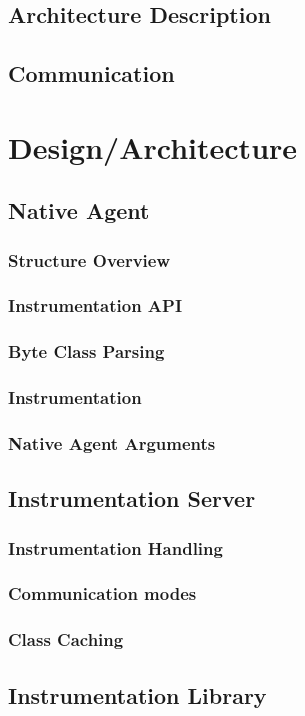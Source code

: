 \documentclass[12pt,a4paper]{report}
\begin{document}
\section{Architecture Description}
\section{Communication}

\chapter{Design/Architecture}
\section{Native Agent}
\subsection{Structure Overview}
\subsection{Instrumentation API}
\subsection{Byte Class Parsing}
\subsection{Instrumentation}
\subsection{Native Agent Arguments}
\section{Instrumentation Server}
\subsection{Instrumentation Handling}
\subsection{Communication modes}
\subsection{Class Caching}
\section{Instrumentation Library}
\end{document}
